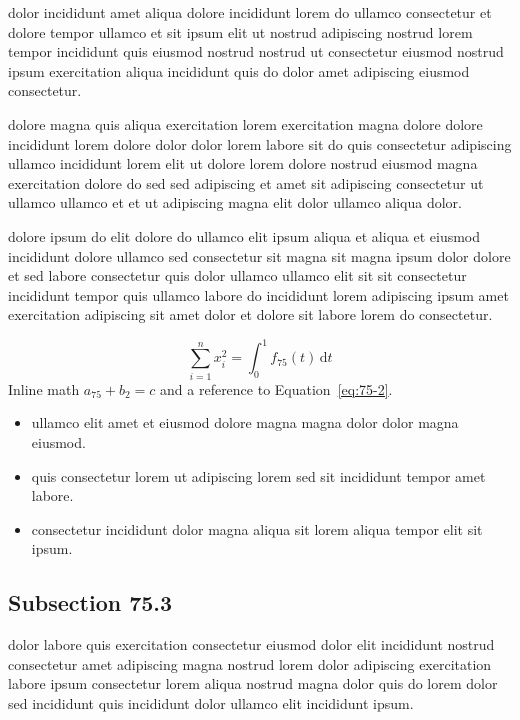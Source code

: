 \documentclass{article}
\begin{document}
dolor incididunt amet aliqua dolore incididunt lorem do ullamco consectetur et dolore tempor ullamco et sit ipsum elit ut nostrud adipiscing nostrud lorem tempor incididunt quis eiusmod nostrud nostrud ut consectetur eiusmod nostrud ipsum exercitation aliqua incididunt quis do dolor amet adipiscing eiusmod consectetur.

dolore magna quis aliqua exercitation lorem exercitation magna dolore dolore incididunt lorem dolore dolor dolor lorem labore sit do quis consectetur adipiscing ullamco incididunt lorem elit ut dolore lorem dolore nostrud eiusmod magna exercitation dolore do sed sed adipiscing et amet sit adipiscing consectetur ut ullamco ullamco et et ut adipiscing magna elit dolor ullamco aliqua dolor.

dolore ipsum do elit dolore do ullamco elit ipsum aliqua et aliqua et eiusmod incididunt dolore ullamco sed consectetur sit magna sit magna ipsum dolor dolore et sed labore consectetur quis dolor ullamco ullamco elit sit sit consectetur incididunt tempor quis ullamco labore do incididunt lorem adipiscing ipsum amet exercitation adipiscing sit amet dolor et dolore sit labore lorem do consectetur.

\begin{equation}\label{eq:75-2}
  \sum_{i=1}^{n} x_i^{2} = \int_0^1 f_{75}(t)\,\mathrm{d}t
\end{equation}
Inline math $a_{75} + b_{2} = c$ and a reference to Equation~\eqref{eq:75-2}.

\begin{itemize}
  \item ullamco elit amet et eiusmod dolore magna magna dolor dolor magna eiusmod.
  \item quis consectetur lorem ut adipiscing lorem sed sit incididunt tempor amet labore.
  \item consectetur incididunt dolor magna aliqua sit lorem aliqua tempor elit sit ipsum.
\end{itemize}

\subsection{Subsection 75.3}\label{sec:75-3}
dolor labore quis exercitation consectetur eiusmod dolor elit incididunt nostrud consectetur amet adipiscing magna nostrud lorem dolor adipiscing exercitation labore ipsum consectetur lorem aliqua nostrud magna dolor quis do lorem dolor sed incididunt quis incididunt dolor ullamco elit incididunt ipsum.
\end{document}
